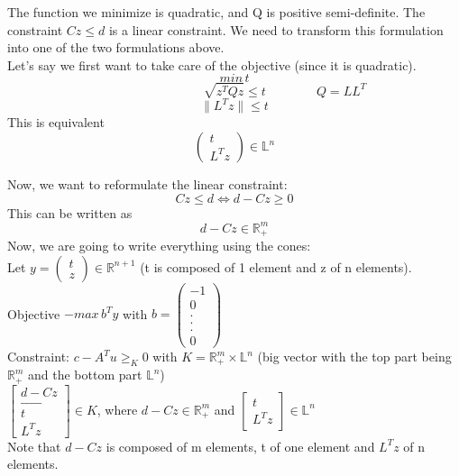 \documentclass[11pt,a4paper]{article}
\begin{document}
The function we minimize is quadratic, and Q is positive semi-definite. The constraint $Cz \leq d$ is a linear constraint. We need to transform this formulation into one of the two formulations above. \\
Let's say we first want to take care of the objective (since it is quadratic). 
$$min \, t$$
$$\qquad \qquad \qquad \qquad \sqrt{z^TQz}\leq t \qquad \qquad Q=LL^T$$
$$\parallel L^Tz \parallel \leq t$$
This is equivalent 
$$\begin{pmatrix}
t\\
L^Tz
\end{pmatrix} \in \mathbb{L}^n$$

Now, we want to reformulate the linear constraint: 
$$Cz\leq d \Longleftrightarrow d-Cz \geq 0$$
This can be written as 
$$d-Cz \in \mathbb{R}^m_+$$
Now, we are going to write everything using the cones: \\
Let $y=\begin{pmatrix}
t\\
z
\end{pmatrix} \in \mathbb{R}^{n+1}$ (t is composed of 1 element and z of n elements). \\
Objective $-max \, b^Ty$ with $b=\begin{pmatrix}
-1\\
0\\
. \\
. \\
. \\
0
\end{pmatrix}$\\
Constraint: $c-A^Tu \geq_K 0 $ with $K= \mathbb{R}^m_+ \times \mathbb{L}^n$ (big vector with the top part being $\mathbb{R}^m_+$ and the bottom part $\mathbb{L}^n$)\\

$\begin{bmatrix}
d-Cz\\
\_ \_ \_ \_ \_ \\
t\\
L^Tz
\end{bmatrix} \in K$, where $d-Cz \in \mathbb{R}^m_+$ and $\begin{bmatrix}
t\\
L^Tz
\end{bmatrix} \in \mathbb{L}^n$\\
Note that $d-Cz$ is composed of m elements, t of one element and $L^Tz$ of n elements. \\
\end{document}
